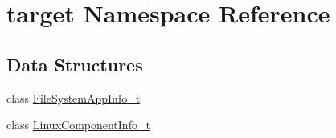 \hypertarget{namespacetarget}{}\section{target Namespace Reference}
\label{namespacetarget}
\subsection*{Data Structures}
\begin{DoxyCompactItemize}
\item 
class \hyperlink{classtarget_1_1_file_system_app_info__t}{File\+System\+App\+Info\+\_\+t}
\item 
class \hyperlink{classtarget_1_1_linux_component_info__t}{Linux\+Component\+Info\+\_\+t}
\end{DoxyCompactItemize}
